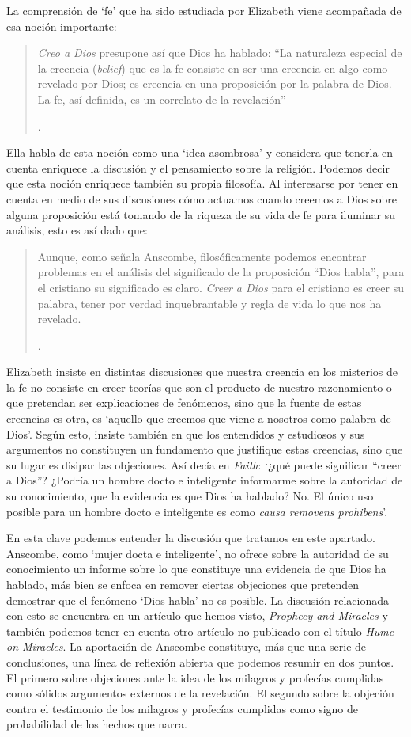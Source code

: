 \label{subsec:fecorrel}
La comprensión de `fe' que ha sido estudiada por Elizabeth viene acompañada de esa noción importante: \blockquote[{\Cite[185]{conesa1994cc}}.]{\emph{Creo a Dios} presupone así que Dios ha hablado: \enquote{La naturaleza especial de la creencia (\emph{belief}) que es la fe consiste en ser una creencia en algo como revelado por Dios; es creencia en una proposición por la palabra de Dios. La fe, así definida, es un correlato de la revelación}}. Ella habla de esta noción como una `idea asombrosa' y considera que tenerla en cuenta enriquece la discusión y el pensamiento sobre la religión. Podemos decir que esta noción enriquece también su propia filosofía. Al interesarse por tener en cuenta en medio de sus discusiones cómo actuamos cuando creemos a Dios sobre alguna proposición está tomando de la riqueza de su vida de fe para iluminar su análisis, esto es así dado que: \blockquote[{\Cite[185]{conesa1994cc}}.]{Aunque, como señala Anscombe, filosóficamente podemos encontrar problemas en el análisis del significado de la proposición \enquote{Dios habla}, para el cristiano su significado es claro. \emph{Creer a Dios} para el cristiano es creer su palabra, tener por verdad inquebrantable y regla de vida lo que nos ha revelado.} Elizabeth insiste en distintas discusiones que nuestra creencia en los misterios de la fe no consiste en creer teorías que son el producto de nuestro razonamiento o que pretendan ser explicaciones de fenómenos, sino que la fuente de estas creencias es otra, es \enquote*{aquello que creemos que viene a nosotros como palabra de Dios}. Según esto, insiste también en que los entendidos y estudiosos y sus argumentos no constituyen un fundamento que justifique estas creencias, sino que su lugar es disipar las objeciones. Así decía en \emph{Faith}: \enquote*{¿qué puede significar ``creer a Dios''? ¿Podría un hombre docto e inteligente informarme sobre la autoridad de su conocimiento, que la evidencia es que Dios ha hablado? No. El único uso posible para un hombre docto e inteligente es como \emph{causa removens prohibens}}.

En esta clave podemos entender la discusión que tratamos en este apartado. Anscombe, como `mujer docta e inteligente', no ofrece sobre la autoridad de su conocimiento un informe sobre lo que constituye una evidencia de que Dios ha hablado, más bien se enfoca en remover ciertas objeciones que pretenden demostrar que el fenómeno `Dios habla' no es posible. La discusión relacionada con esto se encuentra en un artículo que hemos visto, \emph{Prophecy and Miracles} y también podemos tener en cuenta otro artículo no publicado con el título \emph{Hume on Miracles}. La aportación de Anscombe constituye, más que una serie de conclusiones, una línea de reflexión abierta que podemos resumir en dos puntos. El primero sobre objeciones ante la idea de los milagros y profecías cumplidas como sólidos argumentos externos de la revelación. El segundo sobre la objeción contra el testimonio de los milagros y profecías cumplidas como signo de probabilidad de los hechos que narra.

